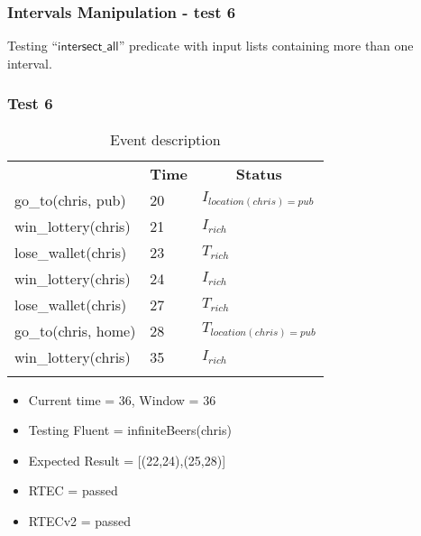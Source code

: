 \documentclass[8pt]{beamer}
\def \patsize {}
\def\intersectall{\textsf{\patsize intersect\_all}}
\begin{document}
\begin{frame}
    \frametitle{Intervals Manipulation - test 6 }
    \small Testing ``$\intersectall$'' predicate with input lists containing more than one interval.\linebreak
    \subsubsection{Test 6}
    \begin{minipage}{0.48\linewidth}
        \begin{table}[t!]
            \caption{Event description}
            \begin{center}
                \begin{tabular}{lll}
                    \hline\noalign{\smallskip}
                    \multicolumn{1}{l}{\textbf{Event}} & \multicolumn{1}{c}{\textbf{Time}} & \multicolumn{1}{c}{\textbf{Status}}  \\
                    go\_to(chris, pub)& 20 & $I_{location(chris)=pub}$\\
                    win\_lottery(chris)&21 &$I_{rich}$\\
                    lose\_wallet(chris)& 23 &$T_{rich}$\\
                    win\_lottery(chris)& 24 &$I_{rich}$\\
                    lose\_wallet(chris)& 27 &$T_{rich}$\\
                    go\_to(chris, home)& 28 &$T_{location(chris)=pub}$\\
                    win\_lottery(chris)& 35&$I_{rich}$\\
                    \noalign{\smallskip}
                    \hline
                \end{tabular}
            \end{center}
        \end{table}

        \begin{itemize}
            \item Current time = 36, Window = 36
            \item Testing Fluent = infiniteBeers(chris)
            \item Expected Result = [(22,24),(25,28)]
            \item RTEC = passed
            \item RTECv2 = passed
        \end{itemize}
    \end{minipage}
    \begin{minipage}{0.48\linewidth}


\end{minipage}
\end{frame}
\end{document}
